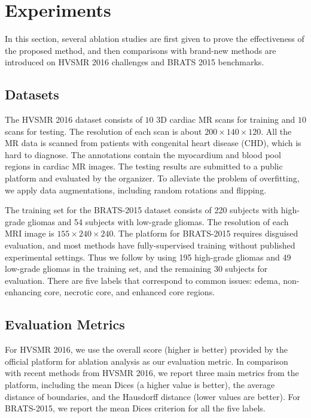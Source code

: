 \documentclass[letterpaper]{article} %
\begin{document}
\section{Experiments}\label{sec:exp}
In this section, several ablation studies are first given to prove the effectiveness of the proposed method, and then comparisons with brand-new methods are introduced on HVSMR 2016 challenges \cite{Pace2015Interactive} and BRATS 2015 \cite{kistler2013virtual} benchmarks.

\subsection{Datasets}
The HVSMR 2016 dataset consists of $10$ 3D cardiac MR scans for training and $10$ scans for testing.
The resolution of each scan is about $200\times140\times120$.
All the MR data is scanned from patients with congenital heart disease (CHD), which is hard to diagnose.
The annotations contain the myocardium and blood pool regions in cardiac MR images.
The testing results are submitted to a public platform and evaluated by the organizer.
To alleviate the problem of overfitting, we apply data augmentations, including random rotations and flipping.

The training set for the BRATS-2015 dataset consists of 220 subjects with high-grade gliomas and 54 subjects with low-grade gliomas.
The resolution of each MRI image is $155\times 240\times 240$.
The platform for BRATS-2015 requires disguised evaluation, and most methods have fully-supervised training without published experimental settings. 
Thus we follow \cite{Tseng_2017_CVPR} by using 195 high-grade gliomas and 49 low-grade gliomas in the training set, and the remaining 30 subjects for evaluation.
There are five labels that correspond to common issues: edema, non-enhancing core, necrotic core, and enhanced core regions.

\subsection{Evaluation Metrics}
For HVSMR 2016, we use the overall score (higher is better) provided by the official platform for ablation analysis as our evaluation metric.
In comparison with recent methods from HVSMR 2016, we report three main metrics from the platform, including the mean Dices (a higher value is better), the average distance of boundaries, and the Hausdorff distance (lower values are better).
For BRATS-2015, we report the mean Dices criterion for all the five labels.
\end{document}
